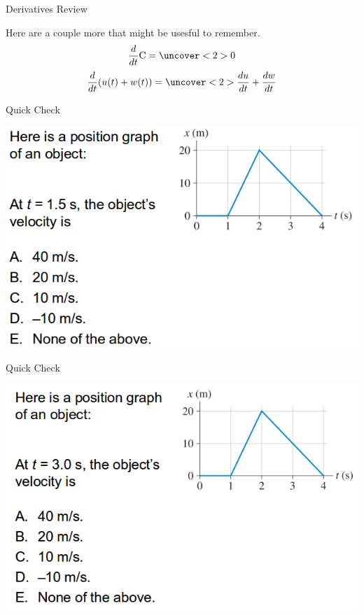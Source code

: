 \documentclass{beamer}
\newcommand{\red}[1]{{\color{red}{#1}}}
\newcommand{\checkL}[2]{\begin{textblock*}{1cm}(#1,#2){\Large \red{\Checkmark}}\end{textblock*}}
\begin{document}
\begin{frame}{Derivatives Review}
\begin{center}
   Here are a couple more that might be usesful to remember.
   \begin{equation*}
      \frac{d}{dt} \text{C} = \uncover<2>{0}
   \end{equation*}
   \begin{equation*}
      \frac{d}{dt} (u(t)+w(t)) = \uncover<2>{\frac{du}{dt}+\frac{dw}{dt}}
   \end{equation*}
\end{center}
\end{frame}

\begin{frame}{Quick Check}
\begin{center}
   \includegraphics[width=\textwidth]{../figures/QC2_6.png}
\end{center}
\only<2->{\checkL{0.7cm}{5.7cm}}
\end{frame}

\begin{frame}{Quick Check}
\begin{center}
   \includegraphics[width=\textwidth]{../figures/QC2_7.png}
\end{center}
\only<2->{\checkL{0.8cm}{6.9cm}}
\end{frame}
\end{document}
